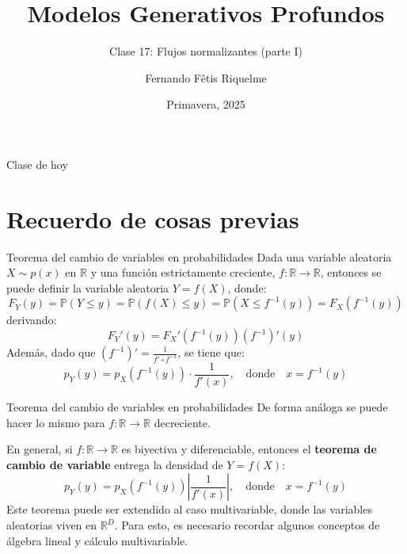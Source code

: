 \documentclass{beamer}
\title{Modelos Generativos Profundos}
\subtitle{Clase 17: Flujos normalizantes (parte I)}
\author{Fernando Fêtis Riquelme}
\institute{
    Facultad de Ciencias Físicas y Matemáticas\\
    Universidad de Chile
}
\date{Primavera, 2025}
\newcommand{\R}{\mathbb{R}}
\newcommand{\pr}{\mathbb{P}}
\begin{document}
\begin{frame}
    \titlepage
\end{frame}

\begin{frame}{Clase de hoy}
    \tableofcontents
\end{frame}

\section{Recuerdo de cosas previas}

\begin{frame}{Teorema del cambio de variables en probabilidades}
    Dada una variable aleatoria $X\sim p(x)$ en $\R$ y una función estrictamente creciente, $f:\R\to\R$, entonces se puede definir la variable aleatoria $Y=f(X)$, donde:
    \begin{equation*}
        F_Y(y)=\pr(Y\leq y)=\pr(f(X)\leq y)=\pr(X\leq f^{-1}(y))=F_X(f^{-1}(y))
    \end{equation*}
    derivando:
    \begin{equation*}
        F_Y'(y) = F_X'(f^{-1}(y))\left(f^{-1}\right)'(y)
    \end{equation*}
    Además, dado que $\left(f^{-1}\right)'=\frac{1}{f'\circ f^{-1}}$, se tiene que:
    \begin{equation*}
        p_Y(y) = p_X(f^{-1}(y))\cdot\frac{1}{f'(x)},
        \quad\text{donde}\quad
        x=f^{-1}(y)
    \end{equation*}
\end{frame}

\begin{frame}{Teorema del cambio de variables en probabilidades}
    De forma análoga se puede hacer lo mismo para $f:\R\to\R$ decreciente.

    En general, si $f:\R\to\R$ es biyectiva y diferenciable, entonces el \textbf{teorema de cambio de variable} entrega la densidad de $Y=f(X)$:
    \begin{equation*}
        p_Y(y) = p_X(f^{-1}(y))\left|\frac{1}{f'(x)}\right|,
        \quad\text{donde}\quad
        x=f^{-1}(y)
    \end{equation*}
    Este teorema puede ser extendido al caso multivariable, donde las variables aleatorias viven en $\R^D$. Para esto, es necesario recordar algunos conceptos de álgebra lineal y cálculo multivariable.
\end{frame}
\end{document}
